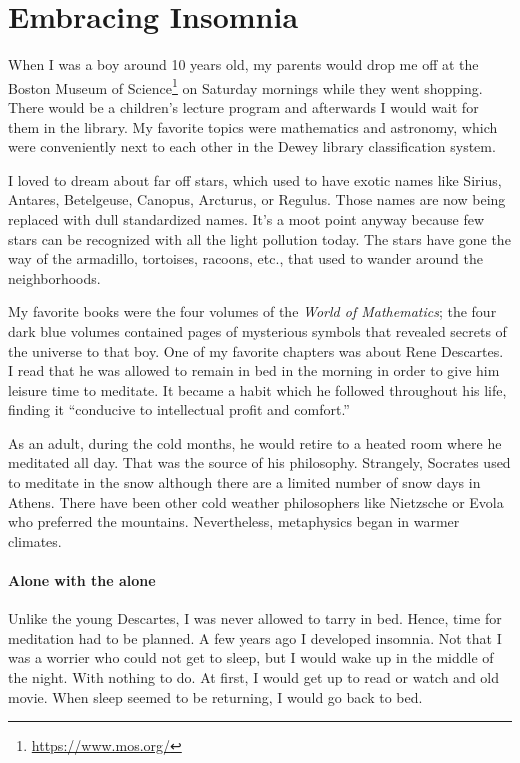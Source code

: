 \section{Embracing Insomnia}

When I was a boy around 10 years old, my parents would drop me off at the Boston Museum of Science\footnote{\url{https://www.mos.org/}} on Saturday mornings while they went shopping. There would be a children's lecture program and afterwards I would wait for them in the library. My favorite topics were mathematics and astronomy, which were conveniently next to each other in the Dewey library classification system.

I loved to dream about far off stars, which used to have exotic names like Sirius, Antares, Betelgeuse, Canopus, Arcturus, or Regulus. Those names are now being replaced with dull standardized names. It's a moot point anyway because few stars can be recognized with all the light pollution today. The stars have gone the way of the armadillo, tortoises, racoons, etc., that used to wander around the neighborhoods.

My favorite books were the four volumes of the \emph{World of Mathematics}; the four dark blue volumes contained pages of mysterious symbols that revealed secrets of the universe to that boy. One of my favorite chapters was about Rene Descartes. I read that he was allowed to remain in bed in the morning in order to give him leisure time to meditate. It became a habit which he followed throughout his life, finding it ``conducive to intellectual profit and comfort.''

As an adult, during the cold months, he would retire to a heated room where he meditated all day. That was the source of his philosophy. Strangely, Socrates used to meditate in the snow although there are a limited number of snow days in Athens. There have been other cold weather philosophers like Nietzsche or Evola who preferred the mountains. Nevertheless, metaphysics began in warmer climates.

\paragraph{Alone with the alone}


Unlike the young Descartes, I was never allowed to tarry in bed. Hence, time for meditation had to be planned. A few years ago I developed insomnia. Not that I was a worrier who could not get to sleep, but I would wake up in the middle of the night. With nothing to do. At first, I would get up to read or watch and old movie. When sleep seemed to be returning, I would go back to bed.

